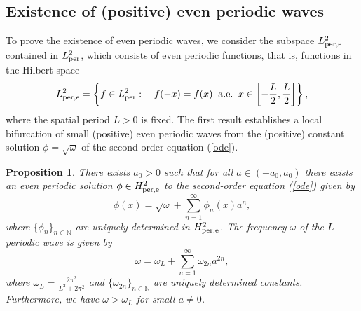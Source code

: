 \documentclass[12pt,reqno]{amsart}
\numberwithin{equation}{section}
\numberwithin{figure}{section}
\newtheorem{proposition}[theorem]{Proposition}
\begin{document}
	\subsection{Existence of (positive) even periodic waves }
	\label{sec-2-2}
	
	
	To prove the existence of even periodic waves, we consider the subspace $L_{\rm per,e}^2$ contained in $L_{\rm per}^2$, which consists of even periodic functions, that is, functions in the Hilbert space
	$$
	L_{\rm per,e}^2 = \left\{ f\in L_{\rm per}^2 : \quad f(-x)=f(x) \;\; {\rm a.e.} \;\; x \in \left[-\frac{L}{2},\frac{L}{2}\right] \right\},
	$$
	where the spatial period $L > 0$ is fixed. The first result establishes a local 
	bifurcation of small (positive) even periodic waves from the (positive) constant solution $\phi = \sqrt{\omega}$ of the second-order equation (\ref{ode}).
	
	\begin{proposition}\label{prop1}
		There exists $a_0>0$ such that for all $a\in (-a_0,a_0)$ there exists an even periodic solution $\phi \in H^2_{\rm per,e}$ to the second-order equation (\ref{ode}) given by  
		\begin{equation}\label{smallsol}
			\phi(x)=\sqrt{\omega}+\sum_{n=1}^{\infty}\phi_n(x)a^n,
		\end{equation}
		where $\{ \phi_n \}_{n \in \mathbb{N}}$ are uniquely determined in $H^2_{\rm per,e}$. The frequency $\omega$ of the $L$-periodic wave is given by
		\begin{equation}\label{freqwave}
			\omega = \omega_L + \sum_{n=1}^{\infty} \omega_{2n} a^{2n},
		\end{equation}
		where $\omega_L = \frac{2 \pi^2}{L^2 + 2 \pi^2}$ and $\{ \omega_{2n} \}_{n \in \mathbb{N}}$ are uniquely determined constants. Furthermore, we have $\omega > \omega_L$ for small $a \neq 0$.
	\end{proposition}
\end{document}
